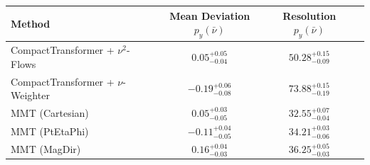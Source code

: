     \begin{tabular}{lccc}
        \toprule
        Method & Mean Deviation $p_{y}(\bar{\nu})$ & Resolution $p_{y}(\bar{\nu})$ \\
        \midrule
        CompactTransformer + $\nu^2$-Flows & $0.05^{+0.05}_{-0.04}$ & $50.28^{+0.15}_{-0.09}$ \\
        CompactTransformer + $\nu$-Weighter & $-0.19^{+0.06}_{-0.08}$ & $73.88^{+0.15}_{-0.19}$ \\
        MMT (Cartesian) & $0.05^{+0.03}_{-0.05}$ & $32.55^{+0.07}_{-0.04}$ \\
        MMT (PtEtaPhi) & $-0.11^{+0.04}_{-0.05}$ & $34.21^{+0.03}_{-0.06}$ \\
        MMT (MagDir) & $0.16^{+0.04}_{-0.03}$ & $36.25^{+0.05}_{-0.03}$ \\
        \bottomrule
    \end{tabular}